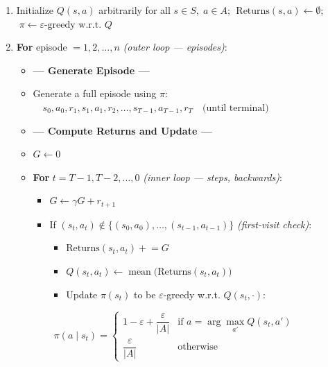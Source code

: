 \documentclass[11pt]{article}
\providecommand{\tightlist}{%
      \setlength{\itemsep}{0pt}\setlength{\parskip}{0pt}}
\begin{document}
\begin{enumerate}
\def\labelenumi{\arabic{enumi}.}
\item
  Initialize \(Q(s,a)\) arbitrarily for all \(s \in S,\; a \in A\);
  \(\;\text{Returns}(s,a) \leftarrow \emptyset\);
  \(\;\pi \leftarrow \varepsilon\text{-greedy w.r.t. } Q\)
\item
  \textbf{For} episode \(= 1, 2, \ldots, n\) \emph{(outer loop ---
  episodes)}:

  \begin{itemize}
  \item
    \textbf{--- Generate Episode ---}
  \item
    Generate a full episode using \(\pi\):
    \(\quad s_0, a_0, r_1, s_1, a_1, r_2, \ldots, s_{T-1}, a_{T-1}, r_T \quad \text{(until terminal)}\)
  \item
    \textbf{--- Compute Returns and Update ---}
  \item
    \(G \leftarrow 0\)
  \item
    \textbf{For} \(t = T{-}1, T{-}2, \ldots, 0\) \emph{(inner loop ---
    steps, backwards)}:

    \begin{itemize}
    \tightlist
    \item
      \(G \leftarrow \gamma G + r_{t+1}\)
    \item
      If \((s_t, a_t) \notin \{(s_0,a_0), \ldots, (s_{t-1},a_{t-1})\}\)
      \emph{(first-visit check)}:

      \begin{itemize}
      \tightlist
      \item
        \(\text{Returns}(s_t, a_t) \mathrel{+}= G\)
      \item
        \(Q(s_t, a_t) \leftarrow \operatorname{mean}\!\bigl(\text{Returns}(s_t, a_t)\bigr)\)
      \item
        Update \(\pi(s_t)\) to be \(\varepsilon\)-greedy w.r.t.
        \(Q(s_t, \cdot)\):
      \end{itemize}
    \end{itemize}
  \end{itemize}
\end{enumerate}

\[\pi(a \mid s_t) = \begin{cases} 1 - \varepsilon + \dfrac{\varepsilon}{|A|} & \text{if } a = \arg\max_{a'} Q(s_t, a') \\[6pt] \dfrac{\varepsilon}{|A|} & \text{otherwise} \end{cases}\]
\end{document}
